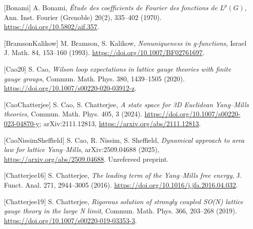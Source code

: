 \documentclass[10pt,letterpaper,twocolumn]{article}
\begin{document}
{[}Bonami{]} A. Bonami, \emph{Étude des coefficients de Fourier des fonctions de \(L^p(G)\)}, Ann. Inst. Fourier (Grenoble) 20(2), 335--402 (1970). \href{https://doi.org/10.5802/aif.357}{https:\allowbreak{}/\allowbreak{}/\allowbreak{}doi.\allowbreak{}org/\allowbreak{}10.\allowbreak{}5802/\allowbreak{}aif.\allowbreak{}357}.

{[}BramsonKalikow{]} M. Bramson, S. Kalikow, \emph{Nonuniqueness in g-functions}, Israel J. Math. 84, 153--160 (1993). \href{https://doi.org/10.1007/BF02761697}{https:\allowbreak{}/\allowbreak{}/\allowbreak{}doi.\allowbreak{}org/\allowbreak{}10.\allowbreak{}1007/\allowbreak{}BF027616\allowbreak{}97}.

{[}Cao20{]} S. Cao, \emph{Wilson loop expectations in lattice gauge theories with finite gauge groups}, Commun. Math. Phys. 380, 1439--1505 (2020). \href{https://doi.org/10.1007/s00220-020-03912-z}{https:\allowbreak{}/\allowbreak{}/\allowbreak{}doi.\allowbreak{}org/\allowbreak{}10.\allowbreak{}1007/\allowbreak{}s00220-\allowbreak{}020-\allowbreak{}03912-\allowbreak{}z}.

{[}CaoChatterjee{]} S. Cao, S. Chatterjee, \emph{A state space for 3D Euclidean Yang--Mills theories}, Commun. Math. Phys. 405, 3 (2024). \href{https://doi.org/10.1007/s00220-023-04870-y}{https:\allowbreak{}/\allowbreak{}/\allowbreak{}doi.\allowbreak{}org/\allowbreak{}10.\allowbreak{}1007/\allowbreak{}s00220-\allowbreak{}023-\allowbreak{}04870-\allowbreak{}y}; arXiv:2111.12813, \href{https://arxiv.org/abs/2111.12813}{https:\allowbreak{}/\allowbreak{}/\allowbreak{}arxiv.\allowbreak{}org/\allowbreak{}abs/\allowbreak{}2111.\allowbreak{}12813}.

{[}CaoNissimSheffield{]} S. Cao, R. Nissim, S. Sheffield, \emph{Dynamical approach to area law for lattice Yang--Mills}, arXiv:2509.04688 (2025), \href{https://arxiv.org/abs/2509.04688}{https:\allowbreak{}/\allowbreak{}/\allowbreak{}arxiv.\allowbreak{}org/\allowbreak{}abs/\allowbreak{}2509.\allowbreak{}04688}. Unrefereed preprint.

{[}Chatterjee16{]} S. Chatterjee, \emph{The leading term of the Yang--Mills free energy}, J. Funct. Anal. 271, 2944--3005 (2016). \href{https://doi.org/10.1016/j.jfa.2016.04.032}{https:\allowbreak{}/\allowbreak{}/\allowbreak{}doi.\allowbreak{}org/\allowbreak{}10.\allowbreak{}1016/\allowbreak{}j.\allowbreak{}jfa.\allowbreak{}2016.\allowbreak{}04.\allowbreak{}032}.

{[}Chatterjee19{]} S. Chatterjee, \emph{Rigorous solution of strongly coupled SO(N) lattice gauge theory in the large N limit}, Commun. Math. Phys. 366, 203--268 (2019). \href{https://doi.org/10.1007/s00220-019-03353-3}{https:\allowbreak{}/\allowbreak{}/\allowbreak{}doi.\allowbreak{}org/\allowbreak{}10.\allowbreak{}1007/\allowbreak{}s00220-\allowbreak{}019-\allowbreak{}03353-\allowbreak{}3}.
\end{document}
